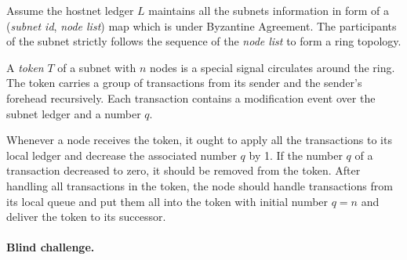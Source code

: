 \documentclass[11pt]{article}
\begin{document}
Assume the hostnet ledger $L$ maintains all the subnets information in form of a (\textit{subnet id}, \textit{node list}) map which is under Byzantine Agreement. The participants of the subnet strictly follows the sequence of the \textit{node list} to form a ring topology.

A \textit{token} $T$ of a subnet with $n$ nodes is a special signal circulates around the ring. The token carries a group of transactions from its sender and the sender{'}s forehead recursively. Each transaction contains a modification event over the subnet ledger and a number $q$.

Whenever a node receives the token, it ought to apply all the transactions to its local ledger and decrease the associated number $q$ by 1. If the number $q$ of a transaction decreased to zero, it should be removed from the token. After handling all transactions in the token, the node should handle transactions from its local queue and put them all into the token with initial number $q=n$ and deliver the token to its successor.


\paragraph{Blind challenge.} %


\end{document}
